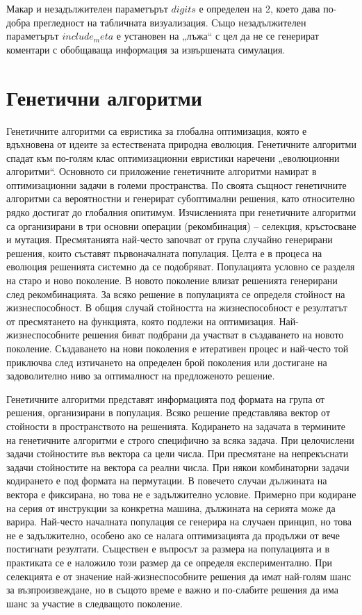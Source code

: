 Макар и незадължителен параметърът $digits$ е определен на 2, което дава по-добра прегледност на табличната визуализация. Също незадължителен параметърът $include_meta$ е установен на „лъжа“ с цел да не се генерират коментари с обобщаваща информация за извършената симулация. 

\section{Генетични алгоритми}

Генетичните алгоритми са евристика за глобална оптимизация, която е вдъхновена от идеите за естествената природна еволюция. Генетичните алгоритми спадат към по-голям клас оптимизационни евристики наречени „еволюционни алгоритми“. Основното си приложение генетичните алгоритми намират в оптимизационни задачи в големи пространства. По своята същност генетичните алгоритми са вероятностни и генерират субоптимални решения, като относително рядко достигат до глобалния опитимум. Изчисленията при генетичните алгоритми са организирани в три основни операции (рекомбинация) – селекция, кръстосване и мутация. Пресмятанията най-често започват от група случайно генерирани решения, които съставят първоначалната популация. Целта е в процеса на еволюция решенията системно да се подобряват. Популацията условно се разделя на старо и ново поколение. В новото поколение влизат решенията генерирани след рекомбинацията. За всяко решение в популацията се определя стойност на жизнеспособност. В общия случай стойността на жизнеспособност е резултатът  от пресмятането на функцията, която подлежи на оптимизация. Най-жизнеспособните решения биват подбрани да участват в създаването на новото поколение. Създаването на нови поколения е итеративен процес и най-често той приключва след изтичането на определен брой поколения или достигане на задоволително ниво за оптималност на предложеното решение. 

Генетичните алгоритми представят информацията под формата на група от решения, организирани в популация. Всяко решение представлява вектор от стойности в пространството на решенията. Кодирането на задачата в термините на генетичните алгоритми е строго специфично за всяка задача. При целочислени задачи стойностите във вектора са цели числа. При пресмятане на непрекъснати задачи стойностите на вектора са реални числа. При някои комбинаторни задачи кодирането е под формата на пермутации. В повечето случаи дължината на вектора е фиксирана, но това не е задължително условие. Примерно при кодиране на серия от инструкции за конкретна машина, дължината на серията може да варира. Най-често началната популация се генерира на случаен принцип, но това не е задължително, особено ако се налага оптимизацията да продължи от вече постигнати резултати. Съществен е въпросът за размера на популацията и в практиката се е наложило този размер да се определя експериментално. При селекцията е от значение най-жизнеспособните решения да имат най-голям шанс за възпроизвеждане, но в същото време е важно и по-слабите решения да има шанс за участие в следващото поколение. 

